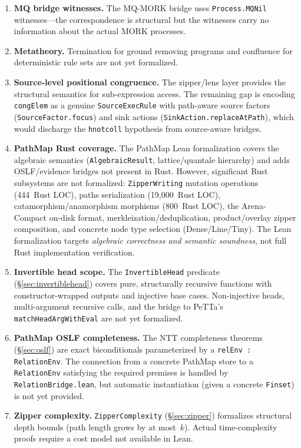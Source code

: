 \documentclass[11pt]{article}
\theoremstyle{definition}
\theoremstyle{remark}
\newcommand{\MORK}{\textup{MORK}}
\newcommand{\PathMap}{\textup{PathMap}}
\begin{document}
\begin{enumerate}
  \item \textbf{MQ bridge witnesses.}
    The MQ-MORK bridge uses \texttt{Process.MQNil} witnesses---the
    correspondence is structural but the witnesses carry no information
    about the actual \MORK{} processes.

  \item \textbf{Metatheory.}
    Termination for ground removing programs and confluence for
    deterministic rule sets are not yet formalized.

  \item \textbf{Source-level positional congruence.}
    \label{sec:future}
    The zipper/lens layer provides the structural semantics for
    sub-expression access.  The remaining gap is encoding
    \texttt{congElem} as a genuine \texttt{SourceExecRule} with
    path-aware source factors (\texttt{SourceFactor.focus}) and sink
    actions (\texttt{SinkAction.replaceAtPath}), which would discharge
    the \texttt{hnotcoll} hypothesis from source-aware bridges.

  \item \textbf{PathMap Rust coverage.}
    The \PathMap{} Lean formalization covers the algebraic semantics
    (\texttt{AlgebraicResult}, lattice/quantale hierarchy) and adds
    OSLF/evidence bridges not present in Rust.
    However, significant Rust subsystems are not formalized:
    \texttt{ZipperWriting} mutation operations (444~Rust LOC),
    paths serialization (19{,}000~Rust LOC),
    catamorphism/anamorphism morphisms (800~Rust LOC),
    the Arena-Compact on-disk format,
    merkleization/deduplication,
    product/overlay zipper composition,
    and concrete node type selection (Dense/Line/Tiny).
    The Lean formalization targets \emph{algebraic correctness and
    semantic soundness}, not full Rust implementation verification.

  \item \textbf{Invertible head scope.}
    The \texttt{InvertibleHead} predicate
    (\S\ref{sec:invertiblehead}) covers pure, structurally recursive
    functions with constructor-wrapped outputs and injective
    base cases.  Non-injective heads, multi-argument recursive calls,
    and the bridge to PeTTa's \texttt{matchHeadArgWithEval} are not
    yet formalized.

  \item \textbf{PathMap OSLF completeness.}
    The NTT completeness theorems (\S\ref{sec:oslf}) are exact
    biconditionals parameterized by a \texttt{relEnv : RelationEnv}.
    The connection from a concrete \PathMap{} store to a
    \texttt{RelationEnv} satisfying the required premises is handled by
    \texttt{RelationBridge.lean}, but automatic instantiation (given a
    concrete \texttt{Finset}) is not yet provided.

  \item \textbf{Zipper complexity.}
    \texttt{ZipperComplexity} (\S\ref{sec:zipper}) formalizes
    structural depth bounds (path length grows by at most~$k$).
    Actual time-complexity proofs require a cost model not available
    in Lean.
\end{enumerate}
\end{document}
